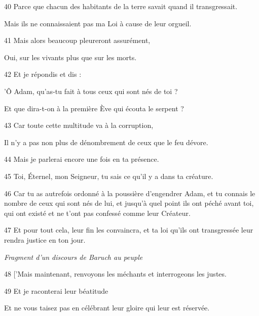 \par 40 Parce que chacun des habitants de la terre savait quand il transgressait.

\par Mais ils ne connaissaient pas ma Loi à cause de leur orgueil.

\par 41 Mais alors beaucoup pleureront assurément,

\par Oui, sur les vivants plus que sur les morts.

\par 42 Et je répondis et dis :

\par 'Ô Adam, qu'as-tu fait à tous ceux qui sont nés de toi ?

\par Et que dira-t-on à la première Ève qui écouta le serpent ?

\par 43 Car toute cette multitude va à la corruption,

\par Il n'y a pas non plus de dénombrement de ceux que le feu dévore.

\par 44 Mais je parlerai encore une fois en ta présence.

\par 45 Toi, Éternel, mon Seigneur, tu sais ce qu'il y a dans ta créature.

\par 46 Car tu as autrefois ordonné à la poussière d'engendrer Adam, et tu connais le nombre de ceux qui sont nés de lui, et jusqu'à quel point ils ont péché avant toi, qui ont existé et ne t'ont pas confessé comme leur Créateur.

\par 47 Et pour tout cela, leur fin les convaincra, et ta loi qu'ils ont transgressée leur rendra justice en ton jour.

\par \textit{Fragment d'un discours de Baruch au peuple}

\par 48 ['Mais maintenant, renvoyons les méchants et interrogeons les justes.

\par 49 Et je raconterai leur béatitude

\par Et ne vous taisez pas en célébrant leur gloire qui leur est réservée.

